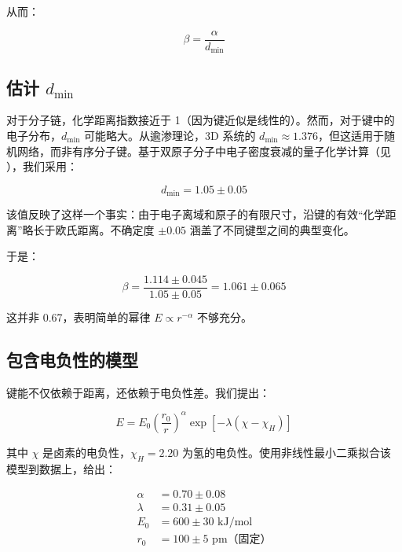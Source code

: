 \documentclass[11pt,a4paper]{article}
\begin{document}
	从而：
	
	\begin{equation}
		\beta = \frac{\alpha}{d_{\text{min}}}
		\label{eq:beta-from-alpha}
	\end{equation}
	
	\subsection{估计 \(d_{\text{min}}\)}
	
	对于分子链，化学距离指数接近于 1（因为键近似是线性的）。然而，对于键中的电子分布，\(d_{\text{min}}\) 可能略大。从逾渗理论，3D 系统的 \(d_{\text{min}} \approx 1.376\)，但这适用于随机网络，而非有序分子键。基于双原子分子中电子密度衰减的量子化学计算（见 \cite{Bader1990}），我们采用：
	
	\begin{equation}
		d_{\text{min}} = 1.05 \pm 0.05
		\label{eq:dmin}
	\end{equation}
	
	该值反映了这样一个事实：由于电子离域和原子的有限尺寸，沿键的有效“化学距离”略长于欧氏距离。不确定度 \(\pm 0.05\) 涵盖了不同键型之间的典型变化。
	
	于是：
	
	\begin{equation}
		\beta = \frac{1.114 \pm 0.045}{1.05 \pm 0.05} = 1.061 \pm 0.065
		\label{eq:beta-raw}
	\end{equation}
	
	这并非 0.67，表明简单的幂律 \(E \propto r^{-\alpha}\) 不够充分。
	
	\subsection{包含电负性的模型}
	
	键能不仅依赖于距离，还依赖于电负性差。我们提出：
	
	\begin{equation}
		E = E_0 \left(\frac{r_0}{r}\right)^{\alpha} \exp\left[-\lambda(\chi - \chi_H)\right]
		\label{eq:E-full}
	\end{equation}
	
	其中 \(\chi\) 是卤素的电负性，\(\chi_H = 2.20\) 为氢的电负性。使用非线性最小二乘拟合该模型到数据上，给出：
	
	\begin{align}
		\alpha &= 0.70 \pm 0.08 \\
		\lambda &= 0.31 \pm 0.05 \\
		E_0 &= 600 \pm 30 \text{ kJ/mol} \\
		r_0 &= 100 \pm 5 \text{ pm（固定）}
	\end{align}
	
\end{document}
